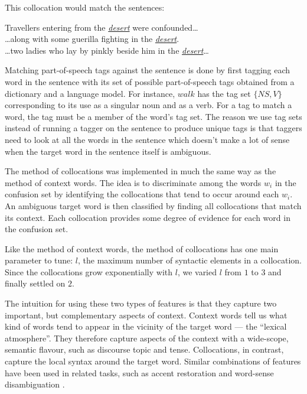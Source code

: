 This collocation would match the sentences:
\begin{center}
    Travellers entering from the \ul{\emph{desert}} were confounded\ldots\\
    \ldots along with some guerilla fighting in the \ul{\emph{desert}}.\\
    \ldots two ladies who lay by pinkly beside him in the \ul{\emph{desert}}\ldots
\end{center}

Matching part-of-speech tags against the sentence is done by first tagging each
word in the sentence with its set of possible part-of-speech tags obtained from
a dictionary and a language model. For instance, \(walk\) has the tag set
\(\{NS, V\}\) corresponding to its use as a singular noun and as a verb. For a
tag to match a word, the tag must be a member of the word's tag set. The reason
we use tag sets instead of running a tagger on the sentence to produce unique
tags is that taggers need to look at all the words in the sentence which
doesn't make a lot of sense when the target word in the sentence itself is
ambiguous.

The method of collocations was implemented in much the same way as the method
of context words. The idea is to discriminate among the words \(w_i\) in the
confusion set by identifying the collocations that tend to occur around each
\(w_i\). An ambiguous target word is then classified by finding all
collocations that match its context. Each collocation provides some degree of
evidence for each word in the confusion set.

Like the method of context words, the method of collocations has one main
parameter to tune: \(l\), the maximum number of syntactic elements in a
collocation. Since the collocations grow exponentially with \(l\), we varied
\(l\) from \(1\) to \(3\) and finally settled on \(2\).


The intuition for using these two types of features is that they capture two
important, but complementary aspects of context. Context words tell us what
kind of words tend to appear in the vicinity of the target word --- the
``lexical atmosphere''. They therefore capture aspects of the context with a
wide-scope, semantic flavour, such as discourse topic and tense. Collocations,
in contrast, capture the local syntax around the target word. Similar
combinations of features have been used in related tasks, such as accent
restoration \cite{yarowsky1994decision} and word-sense disambiguation \cite{ng1996integrating}.\\

